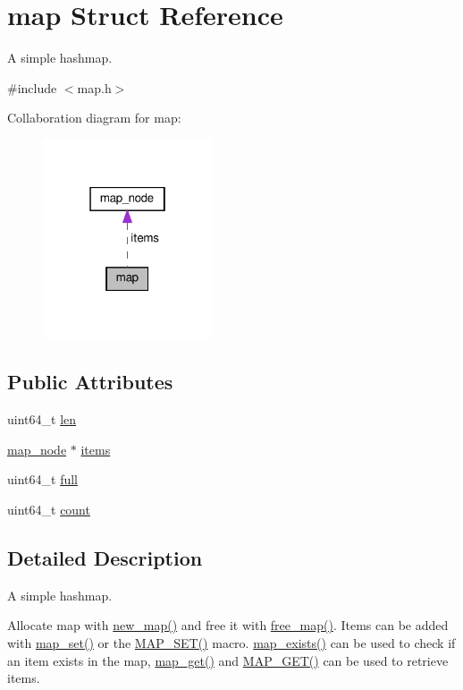 \hypertarget{structmap}{}\section{map Struct Reference}
\label{structmap}


A simple hashmap.  




{\ttfamily \#include $<$map.\+h$>$}



Collaboration diagram for map\+:\nopagebreak
\begin{figure}[H]
\begin{center}
\leavevmode
\includegraphics[width=142pt]{structmap__coll__graph}
\end{center}
\end{figure}
\subsection*{Public Attributes}
\begin{DoxyCompactItemize}
\item 
uint64\+\_\+t \hyperlink{structmap_a5598721b26d57cba0a9d1fb346b62101}{len}
\item 
\hyperlink{structmap__node}{map\+\_\+node} $\ast$ \hyperlink{structmap_a6b38d0a3f8cdff696c5907a53e9f2e42}{items}
\item 
uint64\+\_\+t \hyperlink{structmap_ac907ec19ab9a47454f8192671935f22b}{full}
\item 
uint64\+\_\+t \hyperlink{structmap_a5b34954e76b42c69e8dcc257579ef504}{count}
\end{DoxyCompactItemize}


\subsection{Detailed Description}
A simple hashmap. 

Allocate map with \hyperlink{map_8h_a5193bc7b8432d7e2873579aa63185c27}{new\+\_\+map()} and free it with \hyperlink{map_8h_a55b5ea441f2e33b216dbb120d188626b}{free\+\_\+map()}. Items can be added with \hyperlink{map_8h_aa0a79fdac7a6bbbdab1ecd26c9903e45}{map\+\_\+set()} or the \hyperlink{map_8h_aab70789517583a1c42a66f69dcd14dba}{M\+A\+P\+\_\+\+S\+E\+T()} macro. \hyperlink{map_8h_a8254246acf42bdc32d6e53e17708bcf3}{map\+\_\+exists()} can be used to check if an item exists in the map, \hyperlink{map_8h_aa6bbe7b3686e1bd7f87b86ab48dad6db}{map\+\_\+get()} and \hyperlink{map_8h_a79b7329d2be1fe2b7298e56e53365116}{M\+A\+P\+\_\+\+G\+E\+T()} can be used to retrieve items. 

